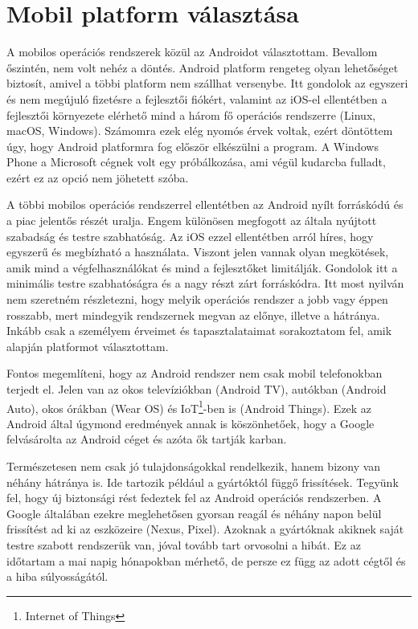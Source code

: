 \documentclass{thesis-ekf}
\theoremstyle{definition}
\theoremstyle{remark}
\begin{document}
\section{Mobil platform választása}

A mobilos operációs rendszerek közül az Androidot választottam. Bevallom őszintén, nem volt nehéz a döntés. 
Android platform rengeteg olyan lehetőséget biztosít, amivel a többi platform nem szállhat versenybe.
Itt gondolok az egyszeri és nem megújuló fizetésre a fejlesztői fiókért, valamint az iOS-el ellentétben a fejlesztői környezete elérhető mind a három fő operációs rendszerre (Linux, macOS, Windows).
Számomra ezek elég nyomós érvek voltak, ezért döntöttem úgy, hogy Android platformra fog először elkészülni a program.
A Windows Phone a Microsoft cégnek volt egy próbálkozása, ami végül kudarcba fulladt, ezért ez az opció nem jöhetett szóba.

A többi mobilos operációs rendszerrel ellentétben az Android nyílt forráskódú és a piac jelentős részét uralja.
Engem különösen megfogott az általa nyújtott szabadság és testre szabhatóság.
Az iOS ezzel ellentétben arról híres, hogy egyszerű és megbízható a használata.
Viszont jelen vannak olyan megkötések, amik mind a végfelhasználókat és mind a fejlesztőket limitálják.
Gondolok itt a minimális testre szabhatóságra és a nagy részt zárt forráskódra.
Itt most nyilván nem szeretném részletezni, hogy melyik operációs rendszer a jobb vagy éppen rosszabb, mert mindegyik rendszernek megvan az előnye, illetve a hátránya.
Inkább csak a személyem érveimet és tapasztalataimat sorakoztatom fel, amik alapján platformot választottam.

Fontos megemlíteni, hogy az Android rendszer nem csak mobil telefonokban terjedt el.
Jelen van az okos televíziókban (Android TV), autókban (Android Auto), okos órákban (Wear OS) és IoT\footnote{Internet of Things}-ben is (Android Things).
Ezek az Android által úgymond eredmények annak is köszönhetőek, hogy a Google felvásárolta az Android céget és azóta ők tartják karban.

Természetesen nem csak jó tulajdonságokkal rendelkezik, hanem bizony van néhány hátránya is.
Ide tartozik például a gyártóktól függő frissítések. Tegyünk fel, hogy új biztonsági rést fedeztek fel az Android operációs rendszerben.
A Google általában ezekre meglehetősen gyorsan reagál és néhány napon belül frissítést ad ki az eszközeire (Nexus, Pixel).
Azoknak a gyártóknak akiknek saját testre szabott rendszerük van, jóval tovább tart orvosolni a hibát.
Ez az időtartam a mai napig hónapokban mérhető, de persze ez függ az adott cégtől és a hiba súlyosságától. 
\end{document}
